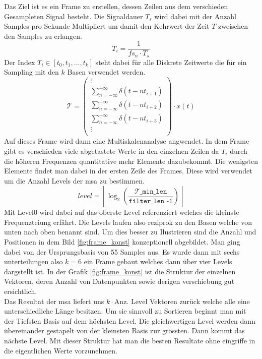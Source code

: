 Das Ziel ist es ein Frame zu erstellen, dessen Zeilen aus dem verschieden Gesampleten Signal besteht. Die Signaldauer $T_{s}$ wird dabei mit der Anzahl Samples pro Sekunde Multipliert um damit den Kehrwert der Zeit $T$ zweischen den Samples zu erlangen.
\[T_{i}=\frac{1}{fs_{n}\cdot T_{s}}\]
Der Index $T_{i}\in[t_{0},t_{1},...,t_{k}]$ steht dabei für alle Diskrete Zeitwerte die für ein Sampling mit den $k$ Basen verwendet werden.
\[
\mathcal{T}
=
\begin{pmatrix}
\vdots\\
\sum_{n=-\infty}^{+\infty} \delta(t - nt_{i+1})\\
\sum_{n=-\infty}^{+\infty} \delta(t - nt_{i+2})\\
\sum_{n=-\infty}^{+\infty} \delta(t - nt_{i+3})\\
\vdots\\
\end{pmatrix}
\cdot x(t)
\]
Auf dieses Frame wird dann eine Multiskalenanalyse angwendet. In dem Frame gibt es verschieden viele abgetastete Werte in den einzelnen Zeilen da $T_{i}$ durch die höheren Frequenzen quantitative mehr Elemente dazubekommt. Die wenigsten Elemente findet man dabei in der ersten Zeile des Frames. Diese wird verwendet um die Anzahl Levels der msa zu bestimmen. 
\[level = \left\lfloor\log_2\left(\mathtt{
	\frac{\mathcal{T}\_\text{min\_len}}{\text{filter\_len -1}}}\right)\right\rfloor
\]
Mit Level0 wird dabei auf das oberste Level referenziert welches die kleinste Frequenzteiung erfährt. Die Levels laufen also reziprok zu den Basen welche von unten nach oben benannt sind. Um dies besser zu Ilustrieren sind die Anzahl und Positionen in dem Bild \ref{fig:frame_konst} konzeptionell abgebildet. Man ging dabei von der Ursprungsbasis von 55 Samples aus. Es wurde dann mit sechs unterteilungen also $k=6$ ein Frame gebaut welches dann über vier Levels dargstellt ist. In der Grafik \ref{fig:frame_konst} ist die Struktur der einzelnen Vektoren, deren Anzahl von Datenpunkten sowie derigen verschiebung gut ersichtlich. \\
  
Das Resultat der msa liefert uns $k\cdot \text{Anz. Level}$ Vektoren zurück welche alle eine unterschiedliche Länge besitzen. Um sie sinnvoll zu Sortieren beginnt man mit der Tiefsten Basis auf dem höchsten Level. Die gleichwertigen Level werden dann übereinander gestapelt von der kleinsten Basis zur grössten. Dann kommt das nächste Level. Mit dieser Struktur hat man die besten Resultate ohne eingriffe in die eigentlichen Werte vorzunehmen. 


